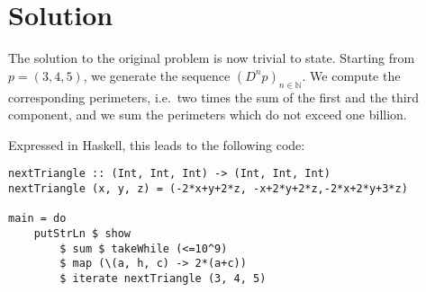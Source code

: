 \documentclass[11pt, twoside, a4paper]{article}
\theoremstyle{definition}
\newcommand{\set}[1]{\mathbb{#1}}
\begin{document}
\section{Solution}
The solution to the original problem is now trivial to state. Starting from $p=(3, 4, 5)$, we generate the sequence $(D^np)_{n\in\set N}$. We compute the corresponding perimeters, i.e.\ two times the sum of the first and the third component, and we sum the perimeters which do not exceed one billion.

Expressed in Haskell, this leads to the following code:
\begin{verbatim}
nextTriangle :: (Int, Int, Int) -> (Int, Int, Int)
nextTriangle (x, y, z) = (-2*x+y+2*z, -x+2*y+2*z,-2*x+2*y+3*z)

main = do
    putStrLn $ show
        $ sum $ takeWhile (<=10^9)
        $ map (\(a, h, c) -> 2*(a+c))
        $ iterate nextTriangle (3, 4, 5)
\end{verbatim}
\end{document}
